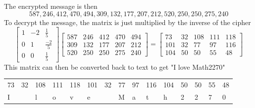 \documentclass{../mathhomework}
\begin{document}
The encrypted message is then
\begin{equation*}
    587, 246, 412, 470, 494, 309, 132, 177, 207, 212, 520, 250, 250, 275, 240
\end{equation*}
To decrypt the message, the matrix is just multiplied by the inverse of the cipher
\begin{equation*}
    \begin{bmatrix}
        1 & -2 & \frac{1}{5} \\ 
        0 & 1 & \frac{-2}{5} \\
        0 & 0 & \frac{1}{5}
    \end{bmatrix}
    \begin{bmatrix}
        587 & 246 & 412 & 470 & 494 \\
        309 & 132 & 177 & 207 & 212 \\
        520 & 250 & 250 & 275 & 240
    \end{bmatrix} =
    \begin{bmatrix}
        73 & 32 & 108 & 111 & 118 \\ 
        101 & 32 & 77 & 97 & 116 \\ 
        104 & 50 & 50 & 55 & 48
    \end{bmatrix}
\end{equation*}
This matrix can then be converted back to text to get "I love Math2270"
\begin{table}[H]
    \begin{tabular}{lllllllllllllll}
        73 & 32 & 108 & 111 & 118 & 101 & 32 & 77 & 97 & 116 & 104 & 50 & 50 & 55 & 48 \\
        I  &    & l   & o   & v   & e   &    & M  & a  & t   & h   & 2  & 2  & 7  & 0 
    \end{tabular}
\end{table}
\pagebreak



\end{document}
